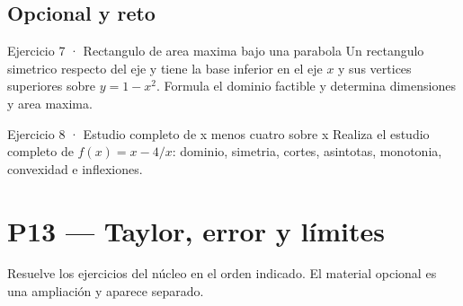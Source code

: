 \documentclass[10pt,a4paper,oneside,openany]{book}
\begin{document}
\section*{Opcional y reto}
\begin{PSevenOptionalFixed}{Ejercicio 7 · Rectangulo de area maxima bajo una parabola}
Un rectangulo simetrico respecto del eje y tiene la base inferior en el eje \(x\) y sus vertices superiores sobre \(y=1-x^{2}\). Formula el dominio factible y determina dimensiones y area maxima.
\end{PSevenOptionalFixed}
\begin{PSevenOptionalFixed}{Ejercicio 8 · Estudio completo de x menos cuatro sobre x}
Realiza el estudio completo de \(f(x)=x-4/x\): dominio, simetria, cortes, asintotas, monotonia, convexidad e inflexiones.
\end{PSevenOptionalFixed}
\chapter{P13 — Taylor, error y límites}
Resuelve los ejercicios del núcleo en el orden indicado. El material opcional es una ampliación y aparece separado.
\end{document}
